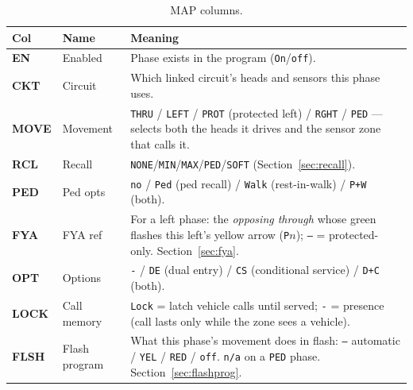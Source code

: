 \documentclass[11pt]{article}
\newcommand{\field}[1]{\textsf{\textbf{#1}}}
\newcommand{\screen}[1]{\textsc{#1}}
\begin{document}
\begin{table}[H]
\centering\small
\begin{tabular}{@{}llp{9.4cm}@{}}
\toprule
\textbf{Col} & \textbf{Name} & \textbf{Meaning} \\
\midrule
\field{EN}   & Enabled  & Phase exists in the program (\texttt{On}/\texttt{off}). \\
\field{CKT}  & Circuit  & Which linked circuit's heads and sensors this phase uses. \\
\field{MOVE} & Movement & \texttt{THRU} / \texttt{LEFT} / \texttt{PROT} (protected left) /
                          \texttt{RGHT} / \texttt{PED} — selects both the heads it drives
                          and the sensor zone that calls it. \\
\field{RCL}  & Recall   & \texttt{NONE}/\texttt{MIN}/\texttt{MAX}/\texttt{PED}/\texttt{SOFT}
                          (Section~\ref{sec:recall}). \\
\field{PED}  & Ped opts & \texttt{no} / \texttt{Ped} (ped recall) / \texttt{Walk}
                          (rest-in-walk) / \texttt{P+W} (both). \\
\field{FYA}  & FYA ref  & For a left phase: the \emph{opposing through} whose green
                          flashes this left's yellow arrow (\texttt{P}$n$);
                          \texttt{--} = protected-only. Section~\ref{sec:fya}. \\
\field{OPT}  & Options  & \texttt{-} / \texttt{DE} (dual entry) / \texttt{CS}
                          (conditional service) / \texttt{D+C} (both). \\
\field{LOCK} & Call memory & \texttt{Lock} = latch vehicle calls until served;
                          \texttt{-} = presence (call lasts only while the zone
                          sees a vehicle). \\
\field{FLSH} & Flash program & What this phase's movement does in flash:
                          \texttt{--} automatic / \texttt{YEL} / \texttt{RED} /
                          \texttt{off}. \texttt{n/a} on a \texttt{PED} phase.
                          Section~\ref{sec:flashprog}. \\
\bottomrule
\end{tabular}
\caption{\screen{MAP} columns.}
\label{tab:map}
\end{table}
\end{document}
